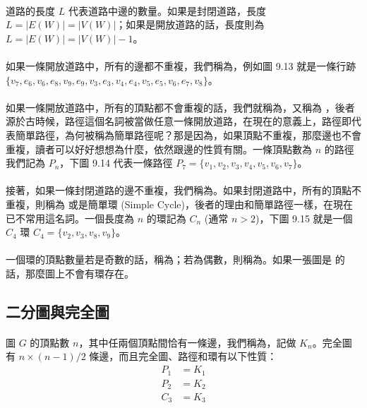 \documentclass[12pt,a4paper,oneside]{report}
\begin{document}
\begin{CJK}{UTF8}{bkai}
\paragraph{}道路的長度 $L$ 代表道路中邊的數量。如果是封閉道路，長度 $L=|E(W)|=|V(W)|$；如果是開放道路的話，長度則為 $L=|E(W)|=|V(W)|-1$。
\paragraph{}如果一條開放道路中，所有的邊都不重複，我們稱為\textbf{}，例如圖 9.13 就是一條行跡 $\{{v_7,e_6,v_6,e_8,v_9,e_9,v_3,e_3,v_4,e_4,v_5,e_5,v_6,e_7,v_8}\}$。
\paragraph{}如果一條開放道路中，所有的頂點都不會重複的話，我們就稱為\textbf{}，又稱為 ，後者源於古時候，路徑這個名詞被當做任意一條開放道路，在現在的意義上，路徑即代表簡單路徑，為何被稱為簡單路徑呢？那是因為，如果頂點不重複，那麼邊也不會重複，讀者可以好好想想為什麼，依然跟邊的性質有關。一條頂點數為 $n$ 的路徑我們記為 $P_n$，下圖 9.14 代表一條路徑 $P_7=\{{v_1,v_2,v_3,v_4,v_5,v_6,v_7}\}$。
\paragraph{}接著，如果一條封閉道路的邊不重複，我們稱為\textbf{}。如果封閉道路中，所有的頂點不重複，則稱為\textbf{} 或是簡單環 (Simple Cycle)，後者的理由和簡單路徑一樣，在現在已不常用這名詞。一個長度為 $n$ 的環記為 $C_n$ (通常 $n>2$)，下圖 9.15 就是一個 $C_4$ 環 $C_4=\{{v_2,v_3,v_8,v_9}\}$。
\paragraph{}一個環的頂點數量若是奇數的話，稱為；若為偶數，則稱為。如果一張圖是\textbf{} 的話，那麼圖上不會有環存在。

\subsection{二分圖與完全圖}
\paragraph{}圖 $G$ 的頂點數 $n$，其中任兩個頂點間恰有一條邊，我們稱為，記做 $K_n$。完全圖有 $n\times{(n-1)}/2$ 條邊，而且完全圖、路徑和環有以下性質：
\begin{align}
\label{eq-complete-graph}
P_1&=K_1\\
P_2&=K_2\\
C_3&=K_3
\end{align}

\end{CJK}
\end{document}

